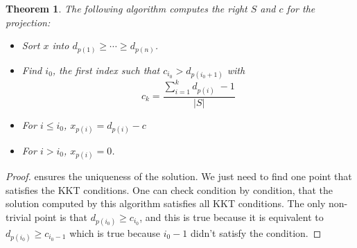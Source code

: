 \documentclass[10pt]{report}
\theoremstyle{plain}
\newtheorem{thm}{Theorem}[chapter]
\newtheorem{lem}[thm]{Lemma}
\theoremstyle{definition}
\theoremstyle{remark}
\newcommand{\R}{\ensuremath{\mathbb{R}}}
\renewcommand{\geq}{\geqslant}
\renewcommand{\leq}{\leqslant}
\begin{document}










\begin{thm}
  The following algorithm computes the right $S$ and $c$ for the projection:
\begin{itemize}
\item Sort $x$ into $d_{p(1)} \geq \cdots \geq d_{p(n)}$.
\item Find $i_0$, the first index such that $c_{i_0} > d_{p(i_0+1)}$ with
  \[c_k = \frac{\sum\limits_{i = 1}^{k}\! d_{p(i)}\; -1}{|S|}\]
\item For $i \leq i_0$, $x_{p(i)} = d_{p(i)} - c$
\item For $i > i_0$, $x_{p(i)} = 0$.
\end{itemize}
\end{thm}

\begin{proof}
   ensures the uniqueness of the solution. We just need to
  find one point that satisfies the KKT conditions. One can check condition by
  condition, that the solution computed by this algorithm satisfies all KKT
  conditions. The only non-trivial point is that $d_{p(i_0)} \geq c_{i_0}$, and
  this is true because it is equivalent to $d_{p(i_0)} \geq c_{i_0 -1}$ which is
  true because $i_0 -1$ didn't satisfy the condition.
\end{proof}
\end{document}
